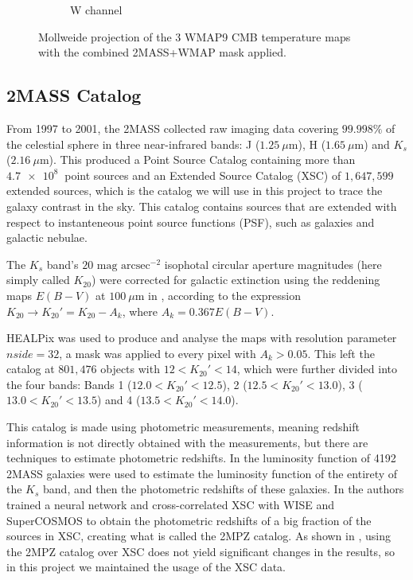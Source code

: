 \documentclass[openany,a4paper,12pt,oneside]{book}
\begin{document}
\begin{spacing}{1.5}
\begin{figure}[!htb]
\begin{subfigure}[b]{0.49\textwidth}
         \caption{W channel}
         \label{fig:Wchannel}
     \end{subfigure}
        \caption{Mollweide projection of the 3 WMAP9 CMB temperature maps with the combined 2MASS+WMAP mask applied.}
        \label{fig:Wmap_maps}
\end{figure}

\subsection{2MASS Catalog}

From 1997 to 2001, the 2MASS collected raw imaging data covering $99.998\%$ of the celestial sphere in three near-infrared bands: J ($\SI{1.25}{\mu \meter}$), H ($\SI{1.65}{\mu \meter}$) and $K_s$ ($\SI{2.16}{\mu \meter}$). This produced a Point Source Catalog containing more than $\SI{4.7e8}{}$ point sources and an Extended Source Catalog (XSC) of $1,647,599$ extended sources, which is the catalog we will use in this project to trace the galaxy contrast in the sky. This catalog contains sources that are extended with respect to instanteneous point source functions (PSF), such as galaxies and galactic nebulae.

The $K_s$ band's $20 \text{ mag arcsec}^{-2}$ isophotal circular aperture magnitudes (here simply called $K_{20}$) were corrected for galactic extinction using the reddening maps $E(B-V)$ at $\SI{100}{\mu \meter}$ in \cite{Schlegel_1998}, according to the expression $K_{20} \rightarrow K_{20}'=K_{20}-A_k$, where $A_k=0.367E(B-V)$.

HEALPix was used to produce and analyse the maps with resolution parameter $nside=32$, a mask was applied to every pixel with $A_k>0.05$. This left the catalog at $801,476$ objects with $12<K_{20}'<14$, which were further divided into the four bands: Bands 1 ($12.0<K_{20}'<12.5$), 2 ($12.5<K_{20}'<13.0$), 3 ($13.0<K_{20}'<13.5$) and 4 ($13.5<K_{20}'<14.0$). 

This catalog is made using photometric measurements, meaning redshift information is not directly obtained with the measurements, but there are techniques to estimate photometric redshifts. In \cite{K20_lum_func} the luminosity function of 4192 2MASS galaxies were used to estimate the luminosity function of the entirety of the $K_s$ band, and then the photometric redshifts of these galaxies. In \cite{2MPZ} the authors trained a neural network and cross-correlated XSC with WISE\cite{WISE} and SuperCOSMOS\cite{SuperCOSMOS} to obtain the photometric redshifts of a big fraction of the sources in XSC, creating what is called the 2MPZ catalog. As shown in \cite{Moura-Santos_2016}, using the 2MPZ catalog over XSC does not yield significant changes in the results, so in this project we maintained the usage of the XSC data.


\end{spacing}
\end{document}
